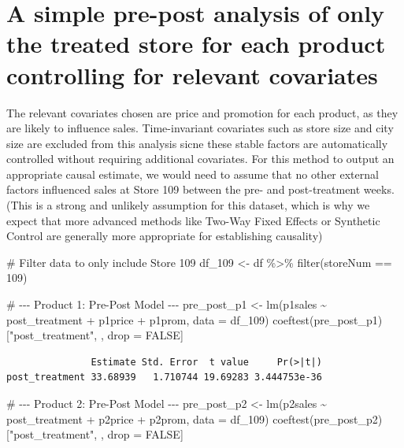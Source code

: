 \documentclass[
  letterpaper,
  DIV=11,
  numbers=noendperiod]{scrartcl}
\newenvironment{Shaded}{\begin{snugshade}}{\end{snugshade}}
\newcommand{\AttributeTok}[1]{\textcolor[rgb]{0.40,0.45,0.13}{#1}}
\newcommand{\CommentTok}[1]{\textcolor[rgb]{0.37,0.37,0.37}{#1}}
\newcommand{\ConstantTok}[1]{\textcolor[rgb]{0.56,0.35,0.01}{#1}}
\newcommand{\DecValTok}[1]{\textcolor[rgb]{0.68,0.00,0.00}{#1}}
\newcommand{\FunctionTok}[1]{\textcolor[rgb]{0.28,0.35,0.67}{#1}}
\newcommand{\NormalTok}[1]{\textcolor[rgb]{0.00,0.23,0.31}{#1}}
\newcommand{\OtherTok}[1]{\textcolor[rgb]{0.00,0.23,0.31}{#1}}
\newcommand{\SpecialCharTok}[1]{\textcolor[rgb]{0.37,0.37,0.37}{#1}}
\newcommand{\StringTok}[1]{\textcolor[rgb]{0.13,0.47,0.30}{#1}}
\begin{document}
\section{A simple pre-post analysis of only the treated store for each
product controlling for relevant
covariates}\label{a-simple-pre-post-analysis-of-only-the-treated-store-for-each-product-controlling-for-relevant-covariates}

The relevant covariates chosen are price and promotion for each product,
as they are likely to influence sales. Time-invariant covariates such as
store size and city size are excluded from this analysis sicne these
stable factors are automatically controlled without requiring additional
covariates. For this method to output an appropriate causal estimate, we
would need to assume that no other external factors influenced sales at
Store 109 between the pre- and post-treatment weeks. (This is a strong
and unlikely assumption for this dataset, which is why we expect that
more advanced methods like Two-Way Fixed Effects or Synthetic Control
are generally more appropriate for establishing causality)

\begin{Shaded}
\begin{Highlighting}[]
\CommentTok{\# Filter data to only include Store 109}
\NormalTok{df\_109 }\OtherTok{\textless{}{-}}\NormalTok{ df }\SpecialCharTok{\%\textgreater{}\%} \FunctionTok{filter}\NormalTok{(storeNum }\SpecialCharTok{==} \DecValTok{109}\NormalTok{)}

\CommentTok{\# {-}{-}{-} Product 1: Pre{-}Post Model {-}{-}{-}}
\NormalTok{pre\_post\_p1 }\OtherTok{\textless{}{-}} \FunctionTok{lm}\NormalTok{(p1sales }\SpecialCharTok{\textasciitilde{}}\NormalTok{ post\_treatment }\SpecialCharTok{+}\NormalTok{ p1price }\SpecialCharTok{+}\NormalTok{ p1prom, }\AttributeTok{data =}\NormalTok{ df\_109)}
\FunctionTok{coeftest}\NormalTok{(pre\_post\_p1)[}\StringTok{"post\_treatment"}\NormalTok{, , drop }\OtherTok{=} \ConstantTok{FALSE}\NormalTok{]}
\end{Highlighting}
\end{Shaded}

\begin{verbatim}
               Estimate Std. Error  t value     Pr(>|t|)
post_treatment 33.68939   1.710744 19.69283 3.444753e-36
\end{verbatim}

\begin{Shaded}
\begin{Highlighting}[]
\CommentTok{\# {-}{-}{-} Product 2: Pre{-}Post Model {-}{-}{-}}
\NormalTok{pre\_post\_p2 }\OtherTok{\textless{}{-}} \FunctionTok{lm}\NormalTok{(p2sales }\SpecialCharTok{\textasciitilde{}}\NormalTok{ post\_treatment }\SpecialCharTok{+}\NormalTok{ p2price }\SpecialCharTok{+}\NormalTok{ p2prom, }\AttributeTok{data =}\NormalTok{ df\_109)}
\FunctionTok{coeftest}\NormalTok{(pre\_post\_p2)[}\StringTok{"post\_treatment"}\NormalTok{, , drop }\OtherTok{=} \ConstantTok{FALSE}\NormalTok{]}
\end{Highlighting}
\end{Shaded}
\end{document}
